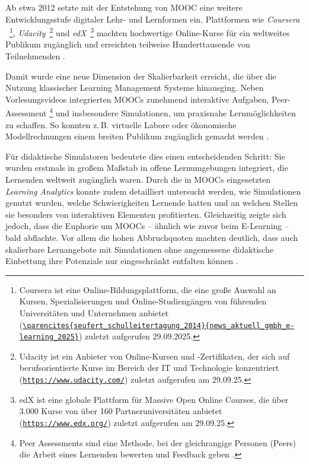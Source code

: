 \iffalse
Ab etwa 2012 setzte mit der Entstehung von \ac{MOOC} eine weitere Entwicklungsstufe digitaler Lehr- und Lernformen ein. Plattformen wie \textit{Coursera} ~\footnote{Coursera ist eine Online-Bildungsplattform, die eine große Auswahl an Kursen, Spezialisierungen und Online-Studiengängen von führenden Universitäten und Unternehmen anbietet (\href{https://www.coursera.org/}{\nolinkurl{\parencites{seufert_schulleitertagung_2014}{news_aktuell_gmbh_e-learning_2025}}}) zuletzt aufgerufen 29.09.2025.}, \textit{Udacity}~\footnote{Udacity ist ein Anbieter von Online-Kursen und -Zertifikaten, der sich auf berufsorientierte Kurse im Bereich der IT und Technologie konzentriert (\href{https://www.udacity.com/)}{\nolinkurl{https://www.udacity.com/}}) zuletzt aufgerufen am 29.09.25.} und \textit{edX}~\footnote{edX ist eine globale Plattform für Massive Open Online Courses, die über 3.000 Kurse von über 160 Partneruniversitäten anbietet (\href{https://www.edx.org/)}{\nolinkurl{https://www.edx.org/}}) zuletzt aufgerufen am 29.09.25.} machten hochwertige Online-Kurse für ein weltweites Publikum zugänglich und erreichten teilweise Hunderttausende von Teilnehmenden \cite{pappano_year_2012}.

Damit wurde eine neue Dimension der Skalierbarkeit erreicht, die über die Nutzung klassischer Learning Management Systeme hinausging. Neben Vorlesungsvideos integrierten MOOCs zunehmend interaktive Aufgaben, Peer-Assessment \footnote{Peer Assessments sind eine Methode, bei der gleichrangige Personen (Peers) die Arbeit eines Lernenden bewerten und Feedback geben \cite{tum_wenn_2022}.} und insbesondere Simulationen, um praxisnahe Lernmöglichkeiten zu schaffen. So konnten z.\,B. virtuelle Labore oder ökonomische Modellrechnungen einem breiten Publikum zugänglich gemacht werden \parencite[S.~5f]{yuan_moocs_2013}.

Für didaktische Simulatoren bedeutete dies einen entscheidenden Schritt: Sie wurden erstmals in großem Maßstab in offene Lernumgebungen integriert, die Lernenden weltweit zugänglich waren.  Durch die in MOOCs eingesetzten \textit{Learning Analytics} konnte zudem detailliert untersucht werden, wie Simulationen genutzt wurden, welche Schwierigkeiten Lernende hatten und an welchen Stellen sie besonders von interaktiven Elementen profitierten. Gleichzeitig zeigte sich jedoch, dass die Euphorie um MOOCs – ähnlich wie zuvor beim E-Learning – bald abflachte. Vor allem die hohen Abbruchquoten machten deutlich, dass auch skalierbare Lernangebote mit Simulationen ohne angemessene didaktische Einbettung ihre Potenziale nur eingeschränkt entfalten können \parencite[S.~1242]{khalil_moocs_2014}. 

